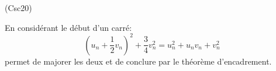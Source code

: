 \begin{tiny}(Csc20)\end{tiny} En considérant le début d'un carré:
\begin{displaymath}
  (u_n+\frac{1}{2}v_n)^2 + \frac{3}{4}v_n^2 = u_n^2 + u_nv_n + v_n^2
\end{displaymath}
permet de majorer les deux et de conclure par le théorème d'encadrement.